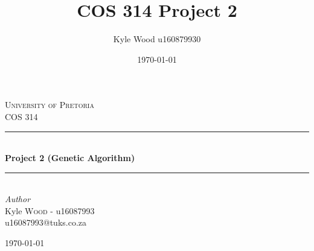 \documentclass{article}
\title{COS 314 Project 2}
\date{\today}
\author{Kyle Wood u160879930}
\begin{document}

\begin{titlepage}
	\newcommand{\HRule}{\rule{\linewidth}{0.5mm}} %
	
	\center %
	
	
	\textsc{\LARGE University of Pretoria}\\[1.5cm] %
	
	\textsc{\Large COS 314}\\[4cm] %
	
	
	
	
	\HRule\\[0.4cm]
	
	{\huge\bfseries Project 2 (Genetic Algorithm)}\\[0.4cm] %
	
	\HRule\\[1.5cm]
	

	
	{\large\textit{Author}}\\
	Kyle \textsc{Wood} - u16087993 %
	\\u16087993@tuks.co.za
	
	\vfill\vfill\vfill %
	
	{\large\today} %
	
	
	 
	
	\vfill %
	
\end{titlepage}
\end{document}
